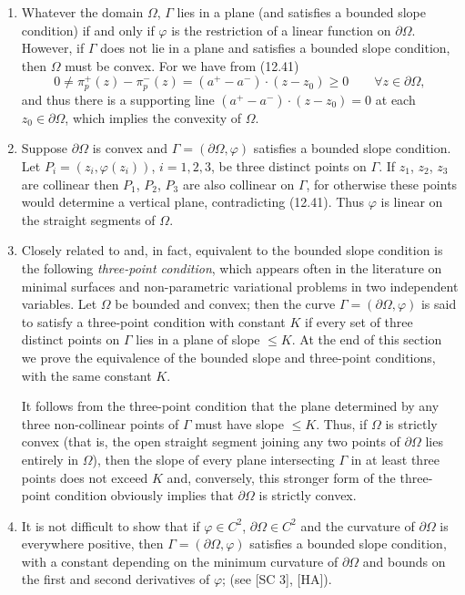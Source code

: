 \begin{enumerate}
\item Whatever the domain $\Omega$, $\Gamma$ lies in a plane (and satisfies a bounded slope
condition) if and only if $\varphi$ is the restriction of a linear function on $\partial\Omega$. However, if
$\Gamma$ does not lie in a plane and satisfies a bounded slope condition, then $\Omega$ must be
convex. For we have from (12.41)
\[
0\neq \pi_p^{+}(z)-\pi_p^{-}(z)=(a^{+}-a^{-})\cdot (z-z_0)\geq 0 \qquad \forall z\in \partial\Omega,
\]
and thus there is a supporting line $(a^{+}-a^{-})\cdot (z-z_0)=0$ at each $z_0\in \partial\Omega$, which
implies the convexity of $\Omega$.

\item Suppose $\partial\Omega$ is convex and $\Gamma=(\partial\Omega,\varphi)$ satisfies a bounded slope condition.
Let $P_i=(z_i,\varphi(z_i))$, $i=1,2,3$, be three distinct points on $\Gamma$. If $z_1$, $z_2$, $z_3$ are collinear
then $P_1$, $P_2$, $P_3$ are also collinear on $\Gamma$, for otherwise these points would determine
a vertical plane, contradicting (12.41). Thus $\varphi$ is linear on the straight segments of $\Omega$.

\item Closely related to and, in fact, equivalent to the bounded slope condition
is the following \emph{three-point condition}, which appears often in the literature on
minimal surfaces and non-parametric variational problems in two independent
variables. Let $\Omega$ be bounded and convex; then the curve $\Gamma=(\partial\Omega,\varphi)$ is said to
satisfy a three-point condition with constant $K$ if every set of three distinct points
on $\Gamma$ lies in a plane of slope $\leq K$. At the end of this section we prove the equivalence
of the bounded slope and three-point conditions, with the same constant $K$.

It follows from the three-point condition that the plane determined by any
three non-collinear points of $\Gamma$ must have slope $\leq K$. Thus, if $\Omega$ is strictly convex
(that is, the open straight segment joining any two points of $\partial\Omega$ lies entirely in $\Omega$),
then the slope of every plane intersecting $\Gamma$ in at least three points does not exceed $K$
and, conversely, this stronger form of the three-point condition obviously implies
that $\partial\Omega$ is strictly convex.

\item It is not difficult to show that if $\varphi\in C^2$, $\partial\Omega\in C^2$ and the curvature of $\partial\Omega$
is everywhere positive, then $\Gamma=(\partial\Omega,\varphi)$ satisfies a bounded slope condition, with
a constant depending on the minimum curvature of $\partial\Omega$ and bounds on the first
and second derivatives of $\varphi$; (see [SC 3], [HA]).
\end{enumerate}

